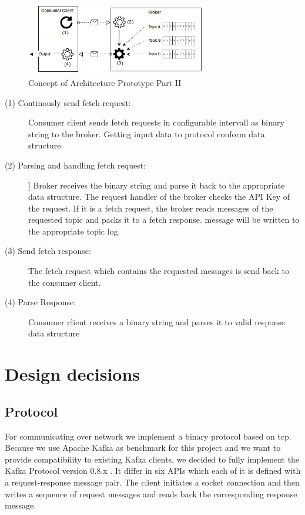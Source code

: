 \begin{figure}[H]
    \centering
   \includegraphics[width=0.7\textwidth]{images/concept_consumer.png}
    \caption{Concept of Architecture Prototype Part II}
    \label{fig:concept-consumer}
\end{figure}

\begin{description}
    \item [(1) Continously send fetch request:] {Consumer client sends fetch
        requests in configurable intervall as binary string to the broker. } 
    {Getting input data to protocol conform data structure.}
    \item [(2) Parsing and handling fetch request:]]  
        {Broker receives the binary string and parse it back to the appropriate
        data structure. The request handler of the broker checks the
        API Key of the request. If it is a fetch request, the broker reads
        messages of the requested topic and packs it to a fetch response. 
        message will be written to the appropriate topic log.}
    \item [(3) Send fetch response:]  
        {The fetch request which contains the requested messages is send back to
        the consumer client.}
    \item [(4) Parse Response:] 
        {Consumer client receives a binary string and parses it to valid response data
        structure }
\end{description}

\section{Design decisions}
\subsection{Protocol}
For communicating over network we implement a binary protocol based on tcp.
Because we use Apache Kafka as benchmark for this project and we want to provide
compatibility to existing Kafka clients, we decided to fully implement the Kafka
Protocol version 0.8.x . It differ in six APIs which each of it is
defined with a request-response message pair. The client initiates a socket connection and then
writes a sequence of request messages and reads back the corresponding response
message. 

